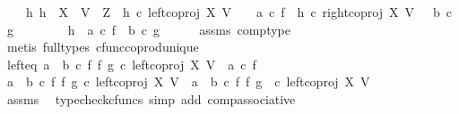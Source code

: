\begin{isabellebody}
\ \ \ \ {\isachardoublequoteopen}{\isasymforall}h{\isachardot}{\kern0pt}\ h\ {\isacharcolon}{\kern0pt}\ X\ {\isasymCoprod}\ V\ {\isasymrightarrow}\ Z\ {\isasymand}\ h\ {\isasymcirc}\isactrlsub c\ left{\isacharunderscore}{\kern0pt}coproj\ X\ V\ \ \ {\isacharequal}{\kern0pt}\ a\ {\isasymcirc}\isactrlsub c\ f\ {\isasymand}\ h\ {\isasymcirc}\isactrlsub c\ right{\isacharunderscore}{\kern0pt}coproj\ X\ V\ \ {\isacharequal}{\kern0pt}\ b\ {\isasymcirc}\isactrlsub c\ g\ {\isasymlongrightarrow}\ \isanewline
\ \ \ \ \ \ h\ {\isacharequal}{\kern0pt}\ {\isacharparenleft}{\kern0pt}a\ {\isasymcirc}\isactrlsub c\ f{\isacharparenright}{\kern0pt}\ {\isasymamalg}\ {\isacharparenleft}{\kern0pt}b\ {\isasymcirc}\isactrlsub c\ g{\isacharparenright}{\kern0pt}{\isachardoublequoteclose}\isanewline
\ \ \ \ \isamarkupfalse%
\ assms\ comp{\isacharunderscore}{\kern0pt}type\ \isamarkupfalse%
\ {\isacharparenleft}{\kern0pt}metis\ {\isacharparenleft}{\kern0pt}full{\isacharunderscore}{\kern0pt}types{\isacharparenright}{\kern0pt}\ cfunc{\isacharunderscore}{\kern0pt}coprod{\isacharunderscore}{\kern0pt}unique{\isacharparenright}{\kern0pt}\ \isanewline
\isanewline
\ \ \isamarkupfalse%
\ left{\isacharunderscore}{\kern0pt}eq{\isacharcolon}{\kern0pt}\ {\isachardoublequoteopen}{\isacharparenleft}{\kern0pt}a\ {\isasymamalg}\ b\ {\isasymcirc}\isactrlsub c\ f\ {\isasymbowtie}\isactrlsub f\ g{\isacharparenright}{\kern0pt}\ {\isasymcirc}\isactrlsub c\ left{\isacharunderscore}{\kern0pt}coproj\ X\ V\ {\isacharequal}{\kern0pt}\ {\isacharparenleft}{\kern0pt}a\ {\isasymcirc}\isactrlsub c\ f{\isacharparenright}{\kern0pt}{\isachardoublequoteclose}\isanewline
\ \ \isamarkupfalse%
\ {\isacharminus}{\kern0pt}\ \isanewline
\ \ \ \ \isamarkupfalse%
\ {\isachardoublequoteopen}{\isacharparenleft}{\kern0pt}a\ {\isasymamalg}\ b\ {\isasymcirc}\isactrlsub c\ f\ {\isasymbowtie}\isactrlsub f\ g{\isacharparenright}{\kern0pt}\ {\isasymcirc}\isactrlsub c\ left{\isacharunderscore}{\kern0pt}coproj\ X\ V\ {\isacharequal}{\kern0pt}\ {\isacharparenleft}{\kern0pt}a\ {\isasymamalg}\ b{\isacharparenright}{\kern0pt}\ {\isasymcirc}\isactrlsub c\ {\isacharparenleft}{\kern0pt}f\ {\isasymbowtie}\isactrlsub f\ g{\isacharparenright}{\kern0pt}\ \ {\isasymcirc}\isactrlsub c\ left{\isacharunderscore}{\kern0pt}coproj\ X\ V{\isachardoublequoteclose}\isanewline
\ \ \ \ \ \ \isamarkupfalse%
\ assms\ \isamarkupfalse%
\ {\isacharparenleft}{\kern0pt}typecheck{\isacharunderscore}{\kern0pt}cfuncs{\isacharcomma}{\kern0pt}\ simp\ add{\isacharcolon}{\kern0pt}\ comp{\isacharunderscore}{\kern0pt}associative{}{\isacharparenright}{\kern0pt}\isanewline

\end{isabellebody}
